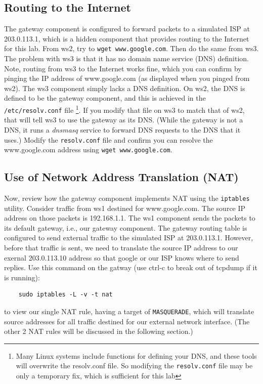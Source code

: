 \subsection{Routing to the Internet}
The gateway component is configured to forward packets to a simulated ISP at 203.0.113.1, which 
is a hidden component that provides routing to the Internet for this lab.  From ws2, 
try to {\tt wget www.google.com}.  Then do the same from ws3.  The problem with ws3 is that
it has no domain name service (DNS) definition.  Note, routing from ws3 to the Internet
works fine, which you can confirm by pinging the IP address of www.google.com (as displayed
when you pinged from ws2).  The ws3 component simply lacks a DNS definition. 
On ws2, the DNS is defined to be the
gateway component, and this is achieved in the \texttt{/etc/resolv.conf} file \footnote{
Many Linux systems include functions for defining your DNS, and these tools will overwrite
the resolv.conf file.  So modifying the {\tt resolv.conf} file may be only a temporary
fix, which is sufficient for this lab}.  If you 
modify that file on ws3 to match that of ws2, that will tell ws3 to use the gateway
as its DNS.  (While the gateway is not a DNS, it runs a \textit{dnsmasq} service to forward DNS requests to
the DNS that it uses.)   Modify the {\tt resolv.conf} file and confirm you can resolve the www.google.com
address using {\tt wget www.google.com}.

\subsection{Use of Network Address Translation (NAT)}
Now, review how the gateway component implements NAT using the \texttt{iptables} 
utility.  Consider traffic from ws1 destined for www.google.com. The source IP address
on those packets is 192.168.1.1.  The ws1 component sends the packets to its default
gateway, i.e., our gateway component.  The gateway routing table is configured to
send external traffic to the simulated ISP at 203.0.113.1.  However, before that traffic is sent, we need
to translate the source IP address to our exernal 203.0.113.10 address so that google or our ISP knows
where to send replies.  
Use this command on the gatway (use ctrl-c to break out of tcpdump if it is running):
\begin{verbatim}
    sudo iptables -L -v -t nat
\end{verbatim}
\noindent to view our single NAT rule, having a target of \texttt{MASQUERADE}, which will translate
source addresses for all traffic destined for our external network interface. (The other 2 NAT rules will
be discussed in the following section.) 

